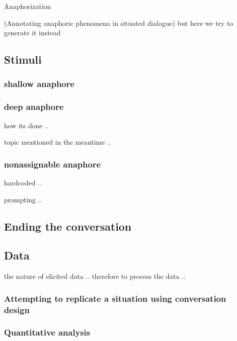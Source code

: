 \documentclass[12pt]{report}
\begin{document}
{\par
Anaphorization

(Annotating anaphoric phenomena in situated dialogue) but here we try to generate it instead


\subsection{Stimuli}

\subsubsection{shallow anaphore}

\subsubsection{deep anaphore}

\par
how its done ..

\par
topic mentioned in the meantime ..

\subsubsection{nonassignable anaphore}

\par
hardcoded ..

\par
prompting ..

\subsection{Ending the conversation}

\subsection{Data}

\par
the nature of elicited data ..
therefore to process the data ..

\subsubsection{Attempting to replicate a situation using conversation design}

\subsubsection{Quantitative analysis}

}
\end{document}
